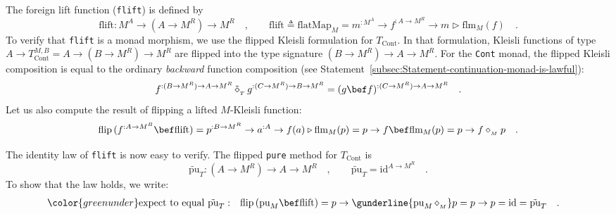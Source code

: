 The foreign lift function (\lstinline!flift!) is defined by
\[
\text{flift}:M^{A}\rightarrow(A\rightarrow M^{R})\rightarrow M^{R}\quad,\quad\quad\text{flift}\triangleq\text{flatMap}_{M}=m^{:M^{A}}\rightarrow f^{:A\rightarrow M^{R}}\rightarrow m\triangleright\text{flm}_{M}(f)\quad.
\]
To verify that \lstinline!flift! is a monad morphism, we use the
flipped Kleisli formulation for $T_{\text{Cont}}$. In that formulation,
Kleisli functions of type $A\rightarrow T_{\text{Cont}}^{M,B}=A\rightarrow(B\rightarrow M^{R})\rightarrow M^{R}$
are flipped into the type signature $(B\rightarrow M^{R})\rightarrow A\rightarrow M^{R}$.
For the \lstinline!Cont! monad, the flipped Kleisli composition is
equal to the ordinary \emph{backward} function composition (see Statement~\ref{subsec:Statement-continuation-monad-is-lawful}):
\begin{equation}
f^{:(B\rightarrow M^{R})\rightarrow A\rightarrow M^{R}}\,\tilde{\diamond}_{_{T}}\,g^{:(C\rightarrow M^{R})\rightarrow B\rightarrow M^{R}}=(g\bef f)^{:(C\rightarrow M^{R})\rightarrow A\rightarrow M^{R}}\quad.\label{eq:continuation-transformer-derivation1}
\end{equation}
Let us also compute the result of flipping a lifted $M$-Kleisli function:
\begin{equation}
\text{flip}\,(f^{:A\rightarrow M^{B}}\bef\text{flift})=p^{:B\rightarrow M^{R}}\rightarrow a^{:A}\rightarrow f(a)\triangleright\text{flm}_{M}(p)=p\rightarrow f\bef\text{flm}_{M}(p)=p\rightarrow f\diamond_{_{M}}p\quad.\label{eq:continuation-transformer-flip-derivation2}
\end{equation}

The identity law of \lstinline!flift! is now easy to verify. The
flipped \lstinline!pure! method for $T_{\text{Cont}}$ is 
\[
\tilde{\text{pu}}_{T}:(A\rightarrow M^{R})\rightarrow A\rightarrow M^{R}\quad,\quad\quad\tilde{\text{pu}}_{T}=\text{id}^{A\rightarrow M^{R}}\quad.
\]
To show that the law holds, we write:
\begin{align*}
{\color{greenunder}\text{expect to equal }\tilde{\text{pu}}_{T}:}\quad & \text{flip}\,(\text{pu}_{M}\bef\text{flift})=p\rightarrow\gunderline{\text{pu}_{M}\,\diamond_{_{M}}}p=p\rightarrow p=\text{id}=\tilde{\text{pu}}_{T}\quad.
\end{align*}

